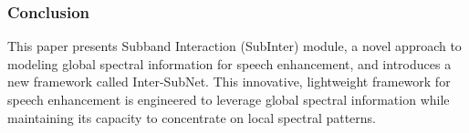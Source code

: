 \subsubsection{Conclusion}
This paper presents Subband Interaction (SubInter) module, a novel approach to modeling global spectral information for speech enhancement, and introduces a new framework called Inter-SubNet. This innovative,
lightweight framework for speech enhancement is engineered to leverage global spectral information while maintaining its capacity to concentrate on local spectral patterns.
    